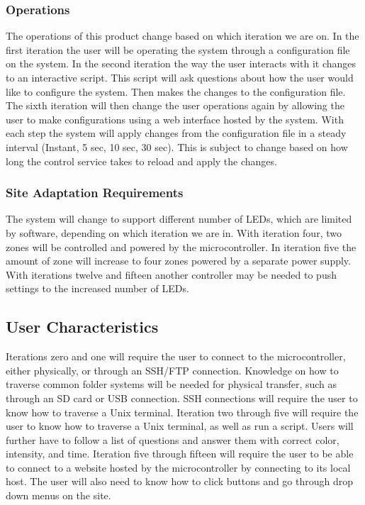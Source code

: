 \documentclass[onecolumn, draftclsnofoot,10pt, compsoc]{IEEEtran}
\begin{document}
			\subsubsection{Operations}
				The operations of this product change based on which iteration we are on. In the first iteration the user will be operating the system through a configuration file on the system. In the second iteration
				the way the user interacts with it changes to an interactive script. This script will ask questions about how the user would like to configure the system. Then makes the changes to the configuration file.
				The sixth iteration will then change the user operations again by allowing the user to make configurations using a web interface hosted by the system. With each step the system will apply changes from the configuration file in a steady interval (Instant, 5 sec, 10 sec, 30 sec). This is subject to change based on how long the control service takes to reload and apply the changes.
			\subsubsection{Site Adaptation Requirements}
				The system will change to support different number of LEDs, which are limited by software, depending on which iteration we are in. With iteration four, two zones will be controlled and powered by the microcontroller.
				In iteration five the amount of zone will increase to four zones powered by a separate power supply. With iterations twelve and fifteen another controller may be needed to push settings to the increased number of LEDs.


		\subsection{User Characteristics}
		Iterations zero and one will require the user to connect to the microcontroller, either physically, or through an SSH/FTP connection. Knowledge on how to traverse common folder systems will be needed for physical transfer, such as
		through an SD card or USB connection. SSH connections will require the user to know how to traverse a Unix terminal.
		Iteration two through five will require the user to know how to traverse a Unix terminal, as well as run a script. Users will further have to follow a list of questions and answer them with correct color, intensity, and time.
		Iteration five through fifteen will require the user to be able to connect to a website hosted by the microcontroller by connecting to its local host. The user will also need to know how to click buttons and go through drop down menus on the site.
\end{document}
